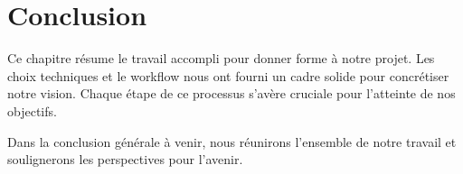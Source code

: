 \section*{Conclusion}
    Ce chapitre résume le travail accompli pour donner forme à notre projet. Les choix techniques et le workflow nous ont fourni un cadre solide pour concrétiser notre vision. Chaque étape de ce processus s'avère cruciale pour l'atteinte de nos objectifs.
    \par Dans la conclusion générale à venir, nous réunirons l'ensemble de notre travail et soulignerons les perspectives pour l'avenir.